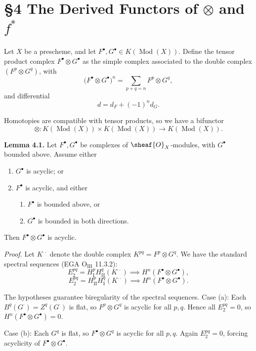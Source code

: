 \setcounter{page}{93}
\section{\S4 The Derived Functors of $\otimes$ and $f^*$}

Let $X$ be a prescheme, and let $F^\bullet,G^\bullet\in K(\operatorname{Mod}(X))$.
Define the tensor product complex $F^\bullet\otimes G^\bullet$ as the simple complex associated to the double complex $(F^p\otimes G^q)$, with
\[
\big(F^\bullet\otimes G^\bullet\big)^n
= \sum_{p+q=n} F^p\otimes G^q,
\]
and differential
\[
d = d_F + (-1)^n d_G.
\]

Homotopies are compatible with tensor products, so we have a bifunctor
\[
\otimes\colon K(\operatorname{Mod}(X)) \times K(\operatorname{Mod}(X))
\to K(\operatorname{Mod}(X)).
\]

\textbf{Lemma 4.1.}
Let $F^\bullet,G^\bullet$ be complexes of $\sheaf{O}_X$-modules, with $G^\bullet$ bounded above.
Assume either
\begin{enumerate}
\item[(a)] $G^\bullet$ is acyclic; or
\item[(b)] $F^\bullet$ is acyclic, and either
        \begin{enumerate}
        \item[1)] $F^\bullet$ is bounded above, or
        \item[2)] $G^\bullet$ is bounded in both directions.
        \end{enumerate}
\end{enumerate}
Then $F^\bullet\otimes G^\bullet$ is acyclic.

\setcounter{page}{94}
\textit{Proof.}
Let $K^{\cdot\cdot}$ denote the double complex $K^{pq}=F^p\otimes G^q$.
We have the standard spectral sequences (EGA $\mathrm{O_{III}}$ 11.3.2):
\[
E_2^{pq} = H_\mathrm{I}^p H_\mathrm{II}^q(K^{\cdot\cdot}) \implies H^n(F^\bullet\otimes G^\bullet),
\]
\[
E_2^{pq} = H_\mathrm{II}^p H_\mathrm{I}^q(K^{\cdot\cdot}) \implies H^n(F^\bullet\otimes G^\bullet).
\]

The hypotheses guarantee biregularity of the spectral sequences.
Case (a): Each $B^q(G^\cdot)=Z^q(G^\cdot)$ is flat, so $F^p\otimes G^q$ is acyclic for all $p,q$.
Hence all $E_2^{pq}=0$, so $H^n(F^\bullet\otimes G^\bullet)=0$.

Case (b): Each $G^q$ is flat, so $F^\bullet\otimes G^q$ is acyclic for all $p,q$.
Again $E_2^{pq}=0$, forcing acyclicity of $F^\bullet\otimes G^\bullet$.

